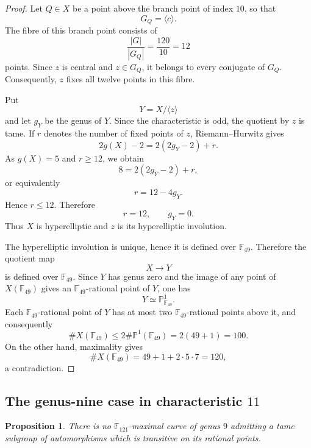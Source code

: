\documentclass[11pt]{amsart}
\newtheorem{proposition}[theorem]{Proposition}
\theoremstyle{remark}
\newcommand{\F}{\mathbb F}
\newcommand{\PP}{\mathbb P}
\begin{document}
\begin{proof}
Let $Q\in X$ be a point above the branch point of index $10$, so that
\[
G_Q=\langle c\rangle.
\]
The fibre of this branch point consists of
\[
\frac{|G|}{|G_Q|}
=
\frac{120}{10}
=
12
\]
points. Since $z$ is central and $z\in G_Q$, it belongs to every
conjugate of $G_Q$. Consequently, $z$ fixes all twelve points in this
fibre.

Put
\[
Y=X/\langle z\rangle
\]
and let $g_Y$ be the genus of $Y$. Since the characteristic is odd,
the quotient by $z$ is tame. If $r$ denotes the number of fixed points
of $z$, Riemann--Hurwitz gives
\[
2g(X)-2
=
2(2g_Y-2)+r.
\]
As $g(X)=5$ and $r\ge12$, we obtain
\[
8=2(2g_Y-2)+r,
\]
or equivalently
\[
r=12-4g_Y.
\]
Hence $r\le12$. Therefore
\[
r=12,
\qquad
g_Y=0.
\]
Thus $X$ is hyperelliptic and $z$ is its hyperelliptic involution.

The hyperelliptic involution is unique, hence it is defined over
$\F_{49}$. Therefore the quotient map
\[
X\longrightarrow Y
\]
is defined over $\F_{49}$. Since $Y$ has genus zero and the image of any point of
$X(\F_{49})$ gives an $\F_{49}$-rational point of $Y$, one has
\[
Y\simeq\PP^1_{\F_{49}}.
\]
Each $\F_{49}$-rational point of $Y$ has at most two
$\F_{49}$-rational points above it, and consequently
\[
\#X(\F_{49})
\le
2\#\PP^1(\F_{49})
=
2(49+1)
=
100.
\]
On the other hand, maximality gives
\[
\#X(\F_{49})
=
49+1+2\cdot5\cdot7
=
120,
\]
a contradiction.
\end{proof}

\subsection{\texorpdfstring{The genus-nine case in characteristic $11$}
{The genus-nine case in characteristic 11}}

\begin{proposition}\label{prop:eleven}
There is no $\F_{121}$-maximal curve of genus $9$ admitting a tame
subgroup of automorphisms which is transitive on its rational points.
\end{proposition}
\end{document}
